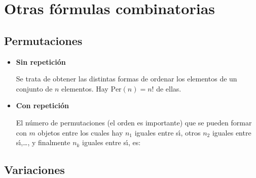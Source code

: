 %
%
%
%

\section{Otras fórmulas combinatorias}



\subsection{Permutaciones}

\begin{itemize}
\item {\bf Sin repetici\'on}

Se trata de obtener las {\sf distintas formas de ordenar} los elementos de un conjunto de $n$ elementos. Hay $\mbox{Per}(n)=n!$ de ellas.

\item {\bf Con repetici\'on}

El n\'umero de permutaciones (el orden es importante) que se pueden formar con $m$ objetos
entre los cuales hay $n_1$ iguales entre s\'{\i}, otros $n_2$ iguales
entre s\'{\i},\dots, y finalmente $n_k$ iguales entre s\'{\i}, es:

\end{itemize}

\subsection{Variaciones}

